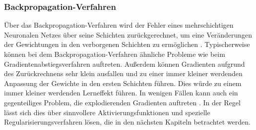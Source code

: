 \documentclass[11pt,bibliography=totocnumbered]{scrartcl}
\begin{document}
\subsubsection{Backpropagation-Verfahren}
Über das Backpropagation-Verfahren wird der Fehler eines mehrschichtigen Neuronalen Netzes über seine Schichten zurückgerechnet, um eine Veränderungen der Gewichtungen in den verborgenen Schichten zu ermöglichen \cite[S.51-52]{NN}.
Typischerweise können bei dem Backpropagation-Verfahren ähnliche Probleme wie beim Gradientenabstiegsverfahren auftreten. Außerdem können Gradienten aufgrund des Zurückrechnens sehr klein ausfallen und zu einer immer kleiner werdenden Anpassung der Gewichte in den ersten Schichten führen. Dies würde zu einem immer kleiner werdenden Lerneffekt führen. In wenigen Fällen kann auch ein gegenteiliges Problem, die explodierenden Gradienten auftreten \cite[S.33-34]{BA}\cite[S.275-276]{MACHINE_LEARNING}. In der Regel lässt sich dies über sinnvollere Aktivierungsfunktionen und spezielle Regularisierungsverfahren lösen, die in den nächsten Kapiteln betrachtet werden.
\end{document}
